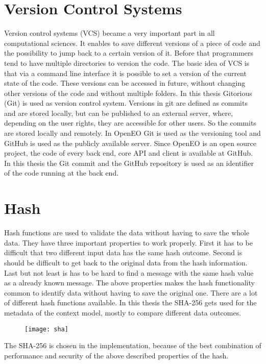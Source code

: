 \documentclass[draft,final]{vutinfth} %
\begin{document}
\section{Version Control Systems}\label{Version Control Systems}
Version control systems (VCS) became a very important part in all computational sciences. It enables to save different versions of a piece of code and the possibility to jump back to a certain version of it. Before that programmers tend to have multiple directories to version the code. The basic idea of VCS is that via a command line interface it is possible to set a version of the current state of the code. These versions can be accessed in future, without changing other versions of the code and without multiple folders. \cite{10.1109/MCSE.2009.194}
In this thesis Gitorious (Git) is used as version control system. Versions in git are defined as commits and are stored locally, but can be published to an external server, where, depending on the user rights, they are accessible for other users. So the commits are stored locally and remotely. \cite{QuickGit} In OpenEO Git is used as the versioning tool and GitHub is used as the publicly available server. Since OpenEO is an open source project, the code of every back end, core API and client is available at GitHub. In this thesis the Git commit and the GitHub repository is used as an identifier of the code running at the back end. 

\section{Hash}\label{Hash}
Hash functions are used to validate the data without having to save the whole data. They have three important properties to work properly. First it has to be difficult that two different input data has the same hash outcome. Second is should be difficult to get back to the original data from the hash information. Last but not least is has to be hard to find a message with the same hash value as a already known message. The above properties makes the hash functionality common to identify data without having to save the original one. \cite{3b412889270f46f59740fbf1ca8cd7e0} There are a lot of different hash functions available. In this thesis the SHA-256 gets used for the metadata of the context model, mostly to compare different data outcomes.

\begin{figure}[h]
	\centering
	\texttt{[image: sha]}
	\caption{\cite{shapaper}}
	\label{fig:sha} %
\end{figure}
The SHA-256 is chosen in the implementation, because of the best combination of performance and security of the above described properties of the hash. 
\end{document}
